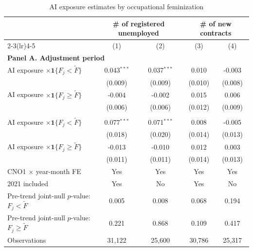 \begin{table}[!htbp]
\centering
\caption{AI exposure estimates by occupational feminization}
\label{tab:v1_feminization_median_split}
\begin{threeparttable}
\scriptsize
\setlength{\tabcolsep}{3.5pt}
\begin{tabular}{@{}lcccc@{}}
\toprule
& \multicolumn{2}{c}{\# of registered unemployed} & \multicolumn{2}{c}{\# of new contracts} \\
\cmidrule(lr){2-3}\cmidrule(lr){4-5}
& (1) & (2) & (3) & (4) \\
\midrule
\multicolumn{5}{l}{\textbf{Panel A. Adjustment period}} \\
AI exposure $\times \mathbf{1}\{F_j < \widetilde F\}$ & 0.043$^{***}$ & 0.037$^{***}$ & 0.010 & -0.003 \\
 & (0.009) & (0.009) & (0.010) & (0.008) \\
AI exposure $\times \mathbf{1}\{F_j \geq \widetilde F\}$ & -0.004 & -0.002 & 0.015 & 0.006 \\
 & (0.006) & (0.006) & (0.012) & (0.009) \\
\addlinespace[2pt]
\multicolumn{5}{l}{\textbf{Panel B. Later post-treatment period}} \\
AI exposure $\times \mathbf{1}\{F_j < \widetilde F\}$ & 0.077$^{***}$ & 0.071$^{***}$ & 0.008 & -0.005 \\
 & (0.018) & (0.020) & (0.014) & (0.013) \\
AI exposure $\times \mathbf{1}\{F_j \geq \widetilde F\}$ & -0.013 & -0.010 & 0.012 & 0.003 \\
 & (0.011) & (0.011) & (0.014) & (0.013) \\
\midrule
CNO1 $\times$ year-month FE & Yes & Yes & Yes & Yes \\
2021 included & Yes & No & Yes & No \\
Pre-trend joint-null $p$-value: $F_j < \widetilde F$ & 0.005 & 0.008 & 0.068 & 0.194 \\
Pre-trend joint-null $p$-value: $F_j \geq \widetilde F$ & 0.221 & 0.868 & 0.109 & 0.417 \\
Observations & 31,122 & 25,600 & 30,786 & 25,317 \\
\bottomrule
\end{tabular}
\begin{tablenotes}[flushleft]
\footnotesize

\end{tablenotes}
\end{threeparttable}
\end{table}
